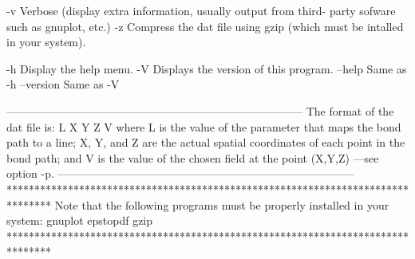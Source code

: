   -v     	Verbose (display extra information, usually output from third-
         	  party sofware such as gnuplot, etc.)
  -z     	Compress the dat file using gzip (which must be intalled
         	   in your system).

  -h     	Display the help menu.
  -V     	Displays the version of this program.
  --help    		Same as -h
  --version 		Same as -V

--------------------------------------------------------------------------------
            	The format of the dat file is:
            	      L  X  Y  Z  V
            	  where L is the value of the parameter that maps the bond
            	  path to a line; X, Y, and Z are the actual spatial coordinates
            	  of each point in the bond path; and V is the value of the
            	  chosen field at the point (X,Y,Z) ---see option -p.
--------------------------------------------------------------------------------
********************************************************************************
  Note that the following programs must be properly installed in your system:
                                    gnuplot
                                    epstopdf
                                      gzip
********************************************************************************
